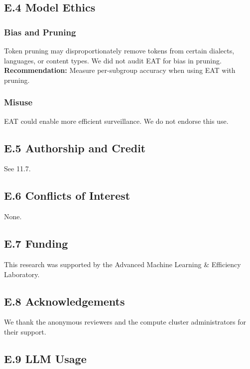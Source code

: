 \subsection{E.4 Model Ethics}

\subsubsection{Bias and Pruning}

Token pruning may disproportionately remove tokens from certain dialects, 
languages, or content types. We did not audit EAT for bias in pruning. 
\textbf{Recommendation:} Measure per-subgroup accuracy when using EAT with 
pruning.

\subsubsection{Misuse}

EAT could enable more efficient surveillance. We do not endorse this use.

\subsection{E.5 Authorship and Credit}

See  11.7.

\subsection{E.6 Conflicts of Interest}

None.

\subsection{E.7 Funding}

This research was supported by the Advanced Machine Learning \& Efficiency Laboratory.

\subsection{E.8 Acknowledgements}

We thank the anonymous reviewers and the compute cluster administrators for their support.

\subsection{E.9 LLM Usage}

